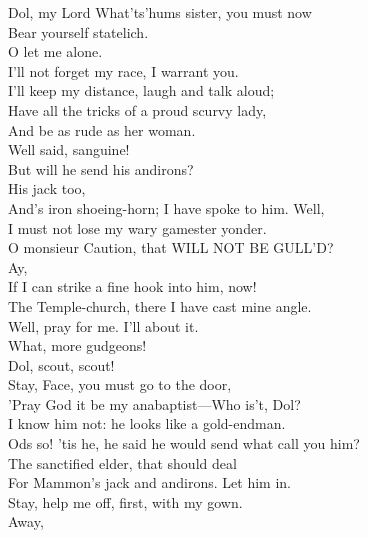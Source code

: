 \documentclass[a4paper,oneside]{memoir}
\begin{document}
\begin{drama*}
\subtlespeaks Dol, my Lord What'ts'hums sister, you must now\\
Bear yourself statelich.\\
\dolspeaks {} O let me alone.\\
I'll not forget my race, I warrant you.\\
I'll keep my distance, laugh and talk aloud;\\
Have all the tricks of a proud scurvy lady,\\
And be as rude as her woman.\\
\facespeaks {} Well said, sanguine!\\
\subtlespeaks But will he send his andirons?\\
\facespeaks {} His jack too,\\
And's iron shoeing-horn; I have spoke to him. Well,\\
I must not lose my wary gamester yonder.\\
\subtlespeaks O monsieur Caution, that WILL NOT BE GULL'D?\\
\facespeaks {} Ay,\\
If I can strike a fine hook into him, now!\\
The Temple-church, there I have cast mine angle.\\
Well, pray for me. I'll about it.\\
\subtlespeaks {} What, more gudgeons!\\
Dol, scout, scout!\\
 Stay, Face, you must go to the door,\\
'Pray God it be my anabaptist---Who is't, Dol?\\
\dolspeaks I know him not: he looks like a gold-endman.\\
\subtlespeaks Ods so! 'tis he, he said he would send what call you him?\\
The sanctified elder, that should deal\\
For Mammon's jack and andirons. Let him in.\\
Stay, help me off, first, with my gown.\\
 Away,\\

\end{drama*}
\end{document}
